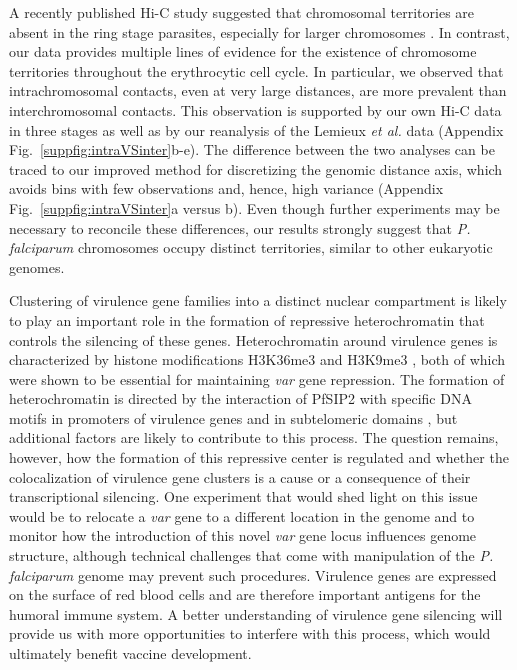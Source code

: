 A recently published Hi-C study suggested that chromosomal territories are
absent in the ring stage parasites, especially for larger chromosomes
\citep{lemieux:genome-wide}. In contrast, our data provides multiple lines of
evidence for the existence of chromosome territories throughout the
erythrocytic cell cycle. In particular, we observed that intrachromosomal
contacts, even at very large distances, are more prevalent than
interchromosomal contacts. This observation is supported by our own Hi-C data
in three stages as well as by our reanalysis of the Lemieux {\em et al.} data
(Appendix Fig.~\ref{suppfig:intraVSinter}b-e). The difference between
the two analyses can be traced to our improved method for discretizing the
genomic distance axis, which avoids bins with few observations and, hence,
high variance (Appendix Fig.~\ref{suppfig:intraVSinter}a versus b). Even
though further experiments may be necessary to reconcile these differences,
our results strongly suggest that {\em P. falciparum} chromosomes occupy
distinct territories, similar to other eukaryotic genomes.

Clustering of virulence gene families into a distinct nuclear compartment is
likely to play an important role in the formation of repressive
heterochromatin that controls the silencing of these genes. Heterochromatin
around virulence genes is characterized by histone modifications H3K36me3
\citep{jiang:pfsetvs} and H3K9me3 \citep{duraisingh:heterochromatin,
lopez-rubio:genome-wide}, both of which were shown to be essential for
maintaining {\em var} gene repression. The formation of heterochromatin is
directed by the interaction of PfSIP2 with specific DNA motifs in promoters of
virulence genes and in subtelomeric domains \citep{flueck:major}, but
additional factors are likely to contribute to this process. The question
remains, however, how the formation of this repressive center is regulated and
whether the colocalization of virulence gene clusters is a cause or a
consequence of their transcriptional silencing. One experiment that would shed
light on this issue would be to relocate a {\em var} gene to a different
location in the genome and to monitor how the introduction of this novel {\em
var} gene locus influences genome structure, although technical challenges
that come with manipulation of the {\em P. falciparum} genome may prevent such
procedures. Virulence genes are expressed on the surface of red blood cells
and are therefore important antigens for the humoral immune system. A better
understanding of virulence gene silencing will provide us with more
opportunities to interfere with this process, which would ultimately benefit
vaccine development.

